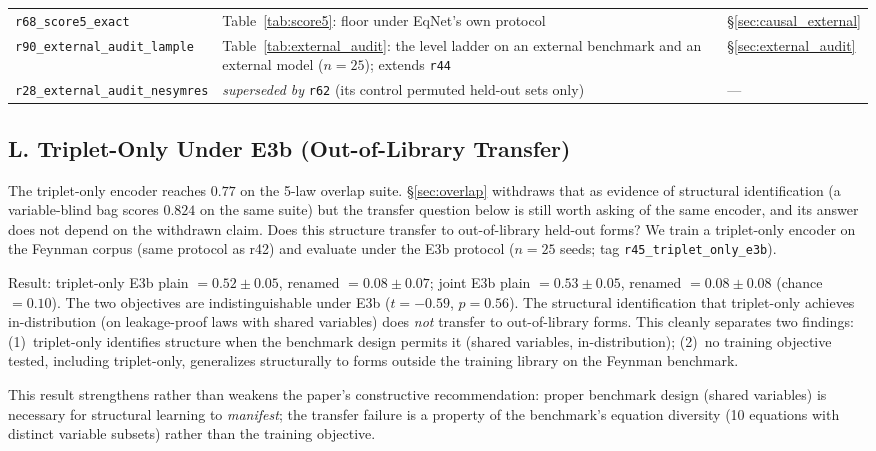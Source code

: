 \begin{center}
\begin{tabular}{@{}p{}p{}p{}@{}}
\texttt{r68\_score5\_exact} & Table~\ref{tab:score5}: floor under EqNet's own protocol & \S\ref{sec:causal_external} \\
\texttt{r90\_external\_audit\_lample} & Table~\ref{tab:external_audit}: the level ladder on an external benchmark and an external model ($n{=}25$); extends \texttt{r44} & \S\ref{sec:external_audit} \\
\texttt{r28\_external\_audit\_nesymres} & \emph{superseded by} \texttt{r62} (its control permuted held-out sets only) & --- \\
\bottomrule
\end{tabular}
\end{center}

\subsection*{L. Triplet-Only Under E3b (Out-of-Library Transfer)}

The triplet-only encoder reaches $0.77$ on the 5-law overlap suite. \S\ref{sec:overlap} withdraws that as evidence of structural identification (a variable-blind bag scores $0.824$ on the same suite) but the transfer question below is still worth asking of the same encoder, and its answer does not depend on the withdrawn claim. Does this structure transfer to out-of-library held-out forms? We train a triplet-only encoder on the Feynman corpus (same protocol as r42) and evaluate under the E3b protocol ($n{=}25$ seeds; tag \texttt{r45\_triplet\_only\_e3b}).

Result: triplet-only E3b plain $= 0.52 \pm 0.05$, renamed $= 0.08 \pm 0.07$; joint E3b plain $= 0.53 \pm 0.05$, renamed $= 0.08 \pm 0.08$ (chance $= 0.10$). The two objectives are indistinguishable under E3b ($t{=}-0.59$, $p{=}0.56$). The structural identification that triplet-only achieves in-distribution (on leakage-proof laws with shared variables) does \emph{not} transfer to out-of-library forms. This cleanly separates two findings: (1)~triplet-only identifies structure when the benchmark design permits it (shared variables, in-distribution); (2)~no training objective tested, including triplet-only, generalizes structurally to forms outside the training library on the Feynman benchmark.

This result strengthens rather than weakens the paper's constructive recommendation: proper benchmark design (shared variables) is necessary for structural learning to \emph{manifest}; the transfer failure is a property of the benchmark's equation diversity (10 equations with distinct variable subsets) rather than the training objective.

